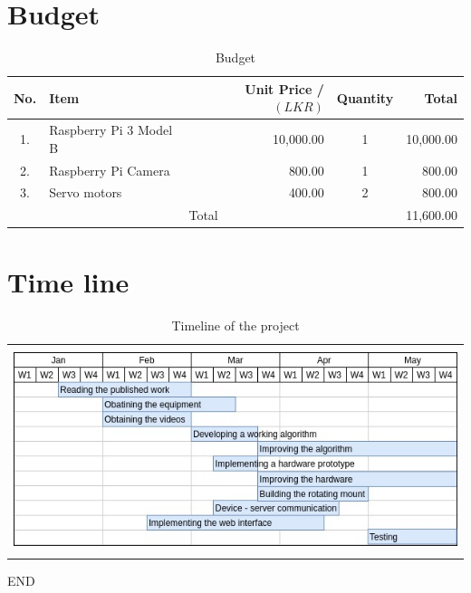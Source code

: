 \documentclass{report}
\begin{document}
\section{Budget}
\begin{table}[h]
    \centering
    \begin{tabular}{|c|l|r|c|r|}
    \hline
         No.    &Item   &Unit Price /$(LKR)$    &Quantity   &Total \\
    \hline
        1.      &   Raspberry Pi 3 Model B   &          10,000.00              &     1      & 10,000.00          \\
        2.      &   Raspberry Pi Camera   &             800.00           &      1     &     800.00      \\
        3.      &   Servo motors   &            400.00            &     2      &    800.00       \\
    \hline
    \multicolumn{4}{|c|}{Total} & 11,600.00\\
    \hline
    \end{tabular}
    \caption{Budget}
    \label{tab:my_label}
\end{table}

\section{Time line}

\begin{table}[H]
    \centering
    \begin{tabular}{c}
        \includegraphics[width=16cm,height=6cm]{Timeline.jpg}
    \end{tabular}
    \caption{Timeline of the project}
    \label{tab:my_label}
\end{table}
\clearpage



\LARGE \centering END
\end{document}

